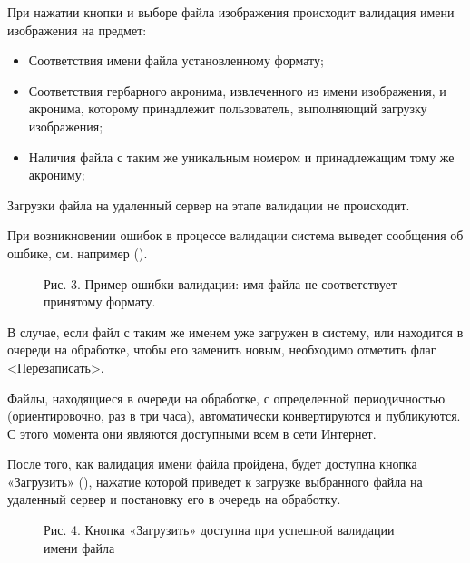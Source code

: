 \documentclass[letterpaper,10pt,russian]{sphinxmanual}
\begin{document}
При нажатии кнопки  и выборе файла изображения происходит валидация
имени изображения на предмет:
\begin{itemize}
\item {} 
Соответствия имени файла установленному формату;

\item {} 
Соответствия гербарного акронима, извлеченного из имени изображения, и акронима,
которому принадлежит пользователь, выполняющий загрузку изображения;

\item {} 
Наличия файла с таким же уникальным номером и принадлежащим тому же акрониму;

\end{itemize}

Загрузки файла на удаленный сервер на этапе валидации не происходит.

При возникновении ошибок в процессе валидации система выведет
сообщения об ошбике, см. например ({\hyperref[\detokenize{scanning:pic3}]{}}).

\begin{figure}[htbp]
\centering
\capstart

\noindent{}
\caption{Рис. 3. Пример ошибки валидации: имя файла не соответствует принятому формату.}\label{\detokenize{scanning:pic3}}\label{\detokenize{scanning:id13}}\end{figure}

В случае, если файл с таким же именем уже загружен в систему,
или находится в очереди на обработке, чтобы его заменить новым, необходимо отметить
флаг \textless{}Перезаписать\textgreater{}.

Файлы, находящиеся в очереди на обработке,
с определенной периодичностью (ориентировочно, раз в три часа),
автоматически конвертируются и публикуются. С этого момента они являются доступными
всем в сети Интернет.

После того, как валидация имени файла пройдена,
будет доступна кнопка «Загрузить» ({\hyperref[\detokenize{scanning:pic4}]{}}), нажатие
которой приведет к загрузке выбранного файла на удаленный сервер и
постановку его в очередь на обработку.

\begin{figure}[htbp]
\centering
\capstart

\noindent{}
\caption{Рис. 4. Кнопка «Загрузить» доступна при успешной валидации имени файла}\label{\detokenize{scanning:pic4}}\label{\detokenize{scanning:id14}}\end{figure}
\end{document}

